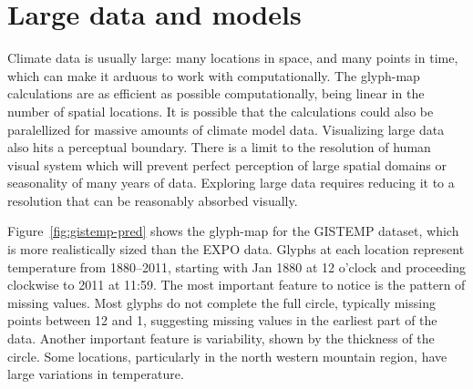 \documentclass[oneside]{article}
\begin{document}

\section{Large data and models}
\label{sec:large-data}

Climate data is usually large: many locations in space, and many points in time, which can make it arduous to work with computationally. The glyph-map calculations are as efficient as possible computationally, being linear in the number of spatial locations. It is possible that the calculations could also be paralellized for massive amounts of climate model data. Visualizing large data also hits a perceptual boundary.  There is a limit to the resolution of human visual system \citep{Kr12} which will prevent perfect perception of large spatial domains or seasonality of many years of data. Exploring large data requires reducing it to a resolution that can be reasonably absorbed visually.


Figure~\ref{fig:gistemp-pred} shows the glyph-map for the GISTEMP dataset, which is more realistically sized than the EXPO data. Glyphs at each location represent temperature from 1880--2011, starting with Jan 1880 at 12 o'clock and proceeding clockwise to 2011 at 11:59. The most important feature to notice is the pattern of missing values. Most glyphs do not complete the full circle, typically missing points between 12 and 1, suggesting missing values in the earliest part of the data. Another important feature is variability, shown by the thickness of the circle. Some locations, particularly in the north western mountain region, have large variations in temperature. 
\end{document}
